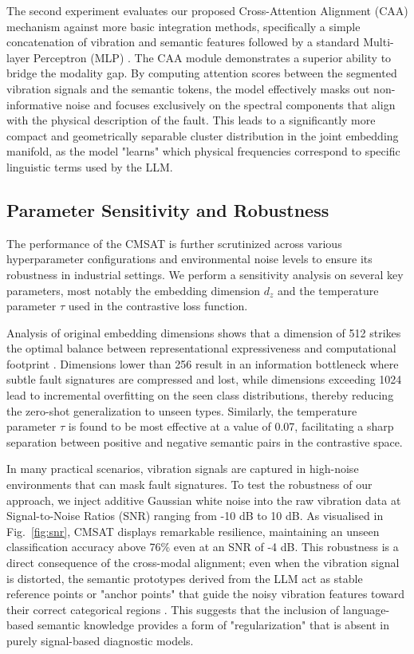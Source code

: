 The second experiment evaluates our proposed Cross-Attention Alignment (CAA) mechanism against more basic integration methods, specifically a simple concatenation of vibration and semantic features followed by a standard Multi-layer Perceptron (MLP) \cite{key_fusion_mech}. The CAA module demonstrates a superior ability to bridge the modality gap. By computing attention scores between the segmented vibration signals and the semantic tokens, the model effectively masks out non-informative noise and focuses exclusively on the spectral components that align with the physical description of the fault. This leads to a significantly more compact and geometrically separable cluster distribution in the joint embedding manifold, as the model "learns" which physical frequencies correspond to specific linguistic terms used by the LLM.

\subsection{Parameter Sensitivity and Robustness}
The performance of the CMSAT is further scrutinized across various hyperparameter configurations and environmental noise levels to ensure its robustness in industrial settings. We perform a sensitivity analysis on several key parameters, most notably the embedding dimension $d_{z}$ and the temperature parameter $\tau$ used in the contrastive loss function.

Analysis of original embedding dimensions shows that a dimension of 512 strikes the optimal balance between representational expressiveness and computational footprint \cite{key_hyperparam_opt}. Dimensions lower than 256 result in an information bottleneck where subtle fault signatures are compressed and lost, while dimensions exceeding 1024 lead to incremental overfitting on the seen class distributions, thereby reducing the zero-shot generalization to unseen types. Similarly, the temperature parameter $\tau$ is found to be most effective at a value of 0.07, facilitating a sharp separation between positive and negative semantic pairs in the contrastive space.

In many practical scenarios, vibration signals are captured in high-noise environments that can mask fault signatures. To test the robustness of our approach, we inject additive Gaussian white noise into the raw vibration data at Signal-to-Noise Ratios (SNR) ranging from -10 dB to 10 dB. As visualised in Fig.~\ref{fig:snr}, CMSAT displays remarkable resilience, maintaining an unseen classification accuracy above 76\% even at an SNR of -4 dB. This robustness is a direct consequence of the cross-modal alignment; even when the vibration signal is distorted, the semantic prototypes derived from the LLM act as stable reference points or "anchor points" that guide the noisy vibration features toward their correct categorical regions \cite{key_robustness_study}. This suggests that the inclusion of language-based semantic knowledge provides a form of "regularization" that is absent in purely signal-based diagnostic models.


